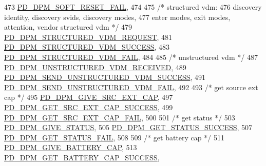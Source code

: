 \begin{DoxyCode}
473     \hyperlink{group__usb__pd__stack_gga6e10571af6af1a42760ea442ab580eb8a0c22065d3fb71fbfef9abe1a385dd661}{PD\_DPM\_SOFT\_RESET\_FAIL},
474 
475     \textcolor{comment}{/* structured vdm:
}
476 \textcolor{comment}{       discovery identity, discovery svids, discovery modes,
}
477 \textcolor{comment}{       enter modes, exit modes, attention, vendor structured vdm */}
479     \hyperlink{group__usb__pd__stack_gga6e10571af6af1a42760ea442ab580eb8a3780d17cd0d9e3a4dea59cc37d6b21f5}{PD\_DPM\_STRUCTURED\_VDM\_REQUEST},
481     \hyperlink{group__usb__pd__stack_gga6e10571af6af1a42760ea442ab580eb8a86c746ea102e63e889d538d6f705d161}{PD\_DPM\_STRUCTURED\_VDM\_SUCCESS},
483     \hyperlink{group__usb__pd__stack_gga6e10571af6af1a42760ea442ab580eb8a695e8a864e1ec8d4af67e207ff4a3496}{PD\_DPM\_STRUCTURED\_VDM\_FAIL},
484 
485     \textcolor{comment}{/* unstructured vdm */}
487     \hyperlink{group__usb__pd__stack_gga6e10571af6af1a42760ea442ab580eb8aba865ebaa6f459beeada24269d03d60c}{PD\_DPM\_UNSTRUCTURED\_VDM\_RECEIVED},
489     \hyperlink{group__usb__pd__stack_gga6e10571af6af1a42760ea442ab580eb8a94f2566e98cfbdc0652b66b36042699e}{PD\_DPM\_SEND\_UNSTRUCTURED\_VDM\_SUCCESS},
491     \hyperlink{group__usb__pd__stack_gga6e10571af6af1a42760ea442ab580eb8ad3a77273432ced03f24d234487c6f072}{PD\_DPM\_SEND\_UNSTRUCTURED\_VDM\_FAIL},
492 
493     \textcolor{comment}{/* get source ext cap */}
495     \hyperlink{group__usb__pd__stack_gga6e10571af6af1a42760ea442ab580eb8a670316f4975a4e2731f51ee420b99ba6}{PD\_DPM\_GIVE\_SRC\_EXT\_CAP},
497     \hyperlink{group__usb__pd__stack_gga6e10571af6af1a42760ea442ab580eb8a767e582b283be0e9c85a03a8fa2a7ad7}{PD\_DPM\_GET\_SRC\_EXT\_CAP\_SUCCESS},
499     \hyperlink{group__usb__pd__stack_gga6e10571af6af1a42760ea442ab580eb8a616a08f0f899286d5e61d8b56ceb8fc2}{PD\_DPM\_GET\_SRC\_EXT\_CAP\_FAIL},
500 
501     \textcolor{comment}{/* get status */}
503     \hyperlink{group__usb__pd__stack_gga6e10571af6af1a42760ea442ab580eb8a20b164e82d99ac69c299ad7cd634e1af}{PD\_DPM\_GIVE\_STATUS},
505     \hyperlink{group__usb__pd__stack_gga6e10571af6af1a42760ea442ab580eb8a8e8ad1c091c6bd98f7d0b2d081ecba93}{PD\_DPM\_GET\_STATUS\_SUCCESS},
507     \hyperlink{group__usb__pd__stack_gga6e10571af6af1a42760ea442ab580eb8a440bbb508768a0bccca64ebc450a001b}{PD\_DPM\_GET\_STATUS\_FAIL},
508 
509     \textcolor{comment}{/* get battery cap */}
511     \hyperlink{group__usb__pd__stack_gga6e10571af6af1a42760ea442ab580eb8a5e3c5980f5866884637cef416af45ab2}{PD\_DPM\_GIVE\_BATTERY\_CAP},
513     \hyperlink{group__usb__pd__stack_gga6e10571af6af1a42760ea442ab580eb8a22fb818c8b5aacce85cfdc2e713901cb}{PD\_DPM\_GET\_BATTERY\_CAP\_SUCCESS},

\end{DoxyCode}
